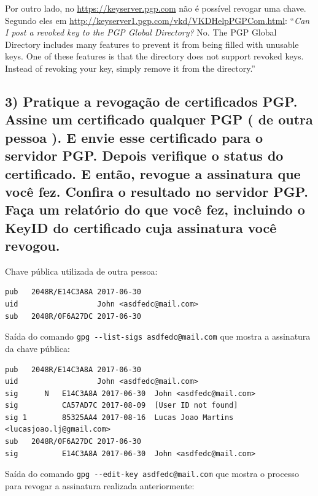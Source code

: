 \documentclass[12pt]{article}
\begin{document}
Por outro lado, no \url{https://keyserver.pgp.com} não é possível revogar uma chave. Segundo eles em \url{http://keyserver1.pgp.com/vkd/VKDHelpPGPCom.html}: ``\textit{Can I post a revoked key to the PGP Global Directory?} No. The PGP Global Directory includes many features to prevent it from being filled with unusable keys. One of these features is that the directory does not support revoked keys. Instead of revoking your key, simply remove it from the directory.''

\subsection*{3) Pratique a revogação de certificados PGP. Assine um certificado qualquer PGP ( de outra pessoa ). E envie esse certificado para o servidor PGP. Depois verifique o status do certificado. E então, revogue a assinatura que você fez. Confira o resultado no servidor PGP. Faça um relatório do que você fez, incluindo o KeyID do certificado cuja assinatura você revogou.}
Chave pública utilizada de outra pessoa:

\begin{lstlisting}
pub   2048R/E14C3A8A 2017-06-30
uid                  John <asdfedc@mail.com>
sub   2048R/0F6A27DC 2017-06-30
\end{lstlisting}

Saída do comando \lstinline{gpg --list-sigs asdfedc@mail.com} que mostra a assinatura da chave pública:

\begin{lstlisting}
pub   2048R/E14C3A8A 2017-06-30
uid                  John <asdfedc@mail.com>
sig      N   E14C3A8A 2017-06-30  John <asdfedc@mail.com>
sig          CA57AD7C 2017-08-09  [User ID not found]
sig 1        85325AA4 2017-08-16  Lucas Joao Martins <lucasjoao.lj@gmail.com>
sub   2048R/0F6A27DC 2017-06-30
sig          E14C3A8A 2017-06-30  John <asdfedc@mail.com>
\end{lstlisting}

Saída do comando \lstinline{gpg --edit-key asdfedc@mail.com} que mostra o processo para revogar a assinatura realizada anteriormente:
\end{document}
